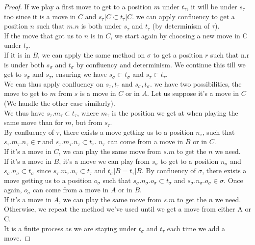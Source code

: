 \documentclass[a4paper,UKenglish]{lipics}
\begin{document}
\begin{proof}
If we play a first move to get to a position $m$ under $t_\tau$, it will be under $s_\tau$ too since it is a move in $C$ and $s_\tau|C \subset t_\tau|C$. we can apply confluency to get a position $n$ such that $m.n$ is both under $s_\tau$ and $t_\tau$ (by determinism of $\tau$).\\ If the move that got us to $n$ is in $C$, we start again by choosing a new move in C under $t_\tau$.\\ If it is in $B$, we can apply the same method on $\sigma$ to get a position $r$ such that n.r is under both $s_\sigma$ and $t_\sigma$ by confluency and determinism. We continue this till we get to $s_\sigma$ and $s_\tau$, ensuring we have  $s_\sigma \subset t_\sigma$ and $s_\tau \subset t_\tau$.\\


We can thus apply confluency on $s_\tau, t_\tau$ and $s_\sigma, t_\sigma$. 
we have two possibilities, the move to get to $m$ from $s$ is a move in $C$ or in $A$.  Let us suppose it's a move in $C$ (We handle the other case similarly).\\ We thus have $s_\tau.m_\tau \subset t_\tau$, where $m_\tau$ is the position we get at when playing the same move than for $m$, but from $s_\tau$. \\By confluency of $\tau$, there exists a move getting us to a position $n_\tau$, such that $s_\tau.m_\tau.n_\tau \in \tau$ and $s_\tau.m_\tau.n_\tau \subset t_\tau$. $n_\tau$ can come from a move in $B$ or in $C$.\\ If it's a move in $C$, we can play the same move from $s.m$ to get the $n$ we need.\\ If it's a move in $B$, it's a move we can play from $s_\sigma$ to get to a position $n_\sigma$ and $s_\sigma.n_\sigma \subset t_\sigma$ since $s_\tau.m_\tau.n_\tau \subset t_\tau$ and $t_\sigma|B=t_\tau|B$. By confluency of $\sigma$, there exists a move getting us to a position $o_\sigma$ such that $s_\sigma.n_\sigma.o_\sigma \subset t_\sigma$ and 
$s_\sigma.n_\sigma.o_\sigma \in \sigma$. Once again, $o_\sigma$ can come from a move in $A$ or in $B$.\\ If it's a move in $A$, we can play the same move from $s.m$ to get the $n$ we need.\\ Otherwise, we repeat the method we've used until we get a move from either A or C. \\It is a finite process as we are staying under $t_\sigma$ and $t_\tau$ each time we add a move.



\end{proof}
\end{document}

